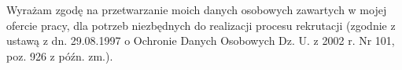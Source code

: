 \documentclass[11pt,a4paper]{moderncv}
\begin{document}


%
%
\closesection{}
\footnotesize{}
Wyrażam zgodę na przetwarzanie moich danych osobowych zawartych w mojej ofercie pracy, dla potrzeb niezbędnych do realizacji procesu rekrutacji (zgodnie z ustawą z dn. 29.08.1997 o Ochronie Danych Osobowych Dz. U. z 2002 r. Nr 101, poz. 926 z późn. zm.).
\end{document}

